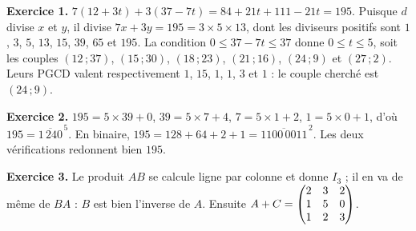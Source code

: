 \begin{corrige}
\textbf{Exercice 1.} $7(12+3t)+3(37-7t) = 84+21t+111-21t = 195$. Puisque $d$ divise $x$
et $y$, il divise $7x+3y = 195 = 3\times5\times13$, dont les diviseurs
positifs sont $1$, $3$, $5$, $13$, $15$, $39$, $65$ et $195$. La condition
$0 \leq 37-7t \leq 37$ donne $0 \leq t \leq 5$, soit les couples
$(12\,;37)$, $(15\,;30)$, $(18\,;23)$, $(21\,;16)$, $(24\,;9)$ et
$(27\,;2)$. Leurs PGCD valent respectivement $1$, $15$, $1$, $1$, $3$ et $1$ :
le couple cherché est $(24\,;9)$.

\textbf{Exercice 2.} $195 = 5\times39+0$, $39 = 5\times7+4$, $7 = 5\times1+2$,
$1 = 5\times0+1$, d'où $195 = \overline{1\,240}^{\,5}$. En binaire,
$195 = 128+64+2+1 = \overline{1100\,0011}^{\,2}$. Les deux vérifications
redonnent bien $195$.

\textbf{Exercice 3.} Le produit $AB$ se calcule ligne par colonne et donne $I_{3}$ ; il
en va de même de $BA$ : $B$ est bien l'inverse de $A$. Ensuite
$A+C = \begin{pmatrix} 2 & 3 & 2 \\ 1 & 5 & 0 \\ 1 & 2 & 3 \end{pmatrix}$.

\end{corrige}
